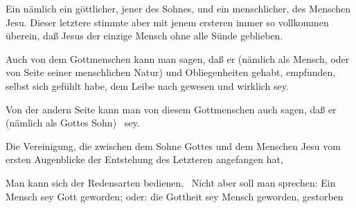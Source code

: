 \begin{aufza}
\begin{aufzb}
\item Ein  nämlich ein göttlicher, jener des Sohnes, und ein menschlicher, des Menschen Jesu. Dieser letztere stimmte aber mit jenem ersteren immer so vollkommen überein, daß Jesus der einzige Mensch ohne alle Sünde geblieben.
\end{aufzb}
\item Auch von dem Gottmenschen kann man sagen, daß er (nämlich als Mensch, oder von Seite seiner menschlichen Natur)  und Obliegenheiten gehabt,  empfunden, selbst sich  gefühlt habe, dem Leibe nach  gewesen und wirklich  sey.
\item Von der andern Seite kann man von diesem Gottmenschen auch sagen, daß er (nämlich als Gottes Sohn)  \usw\ sey.
\item Die Vereinigung, die zwischen dem Sohne Gottes und dem Menschen Jesu vom ersten Augenblicke der Entstehung des Letzteren angefangen hat, 
\item Man kann sich der Redensarten bedienen,  \udgl\  Nicht aber soll man sprechen: Ein Mensch sey Gott geworden; oder: die Gottheit sey Mensch geworden, gestorben \udgl~
\end{aufza}

